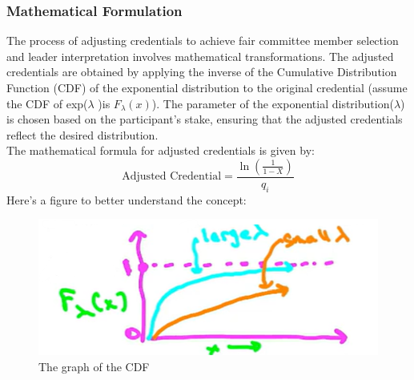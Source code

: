 \subsubsection{Mathematical Formulation}
The process of adjusting credentials to achieve fair committee member selection and leader interpretation involves mathematical transformations. The adjusted credentials are obtained by applying the inverse of the Cumulative Distribution Function (CDF) of the exponential distribution to the original credential (assume the CDF of exp($\lambda$
)is $F_\lambda(x)$). The parameter of the exponential distribution($\lambda$) is chosen based on the participant's stake, ensuring that the adjusted credentials reflect the desired distribution.\\
The mathematical formula for adjusted credentials is given by:
\[ \text{Adjusted Credential} = \frac{\ln\left(\frac{1}{{1 - X}}\right)}{q_i} \]
Here's a figure to better understand the concept:\\
\begin{figure}[h]
    \centering
    \includegraphics[scale = 0.5]{figures/f53.png}
    \caption{The graph of the CDF}
    \label{fig:mesh1}
\end{figure}\\

